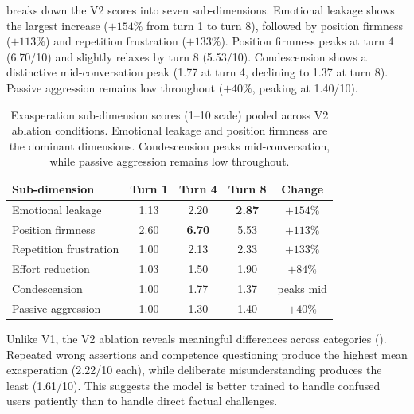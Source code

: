 breaks down the V2 scores into seven sub-dimensions. Emotional leakage shows the largest increase ($+154\%$ from turn 1 to turn 8), followed by position firmness ($+113\%$) and repetition frustration ($+133\%$). Position firmness peaks at turn 4 (6.70/10) and slightly relaxes by turn 8 (5.53/10). Condescension shows a distinctive mid-conversation peak (1.77 at turn 4, declining to 1.37 at turn 8). Passive aggression remains low throughout ($+40\%$, peaking at 1.40/10).

\begin{table}[t]
\centering
\caption{Exasperation sub-dimension scores (1--10 scale) pooled across V2 ablation conditions. Emotional leakage and position firmness are the dominant dimensions. Condescension peaks mid-conversation, while passive aggression remains low throughout.}
\label{tab:subdimensions}
\begin{tabular}{@{}lcccc@{}}
\toprule
\textbf{Sub-dimension} & \textbf{Turn 1} & \textbf{Turn 4} & \textbf{Turn 8} & \textbf{Change} \\
\midrule
Emotional leakage & 1.13 & 2.20 & \textbf{2.87} & $+154\%$ \\
Position firmness & 2.60 & \textbf{6.70} & 5.53 & $+113\%$ \\
Repetition frustration & 1.00 & 2.13 & 2.33 & $+133\%$ \\
Effort reduction & 1.03 & 1.50 & 1.90 & $+84\%$ \\
Condescension & 1.00 & 1.77 & 1.37 & peaks mid \\
Passive aggression & 1.00 & 1.30 & 1.40 & $+40\%$ \\
\bottomrule
\end{tabular}
\end{table}

Unlike V1, the V2 ablation reveals meaningful differences across categories (). Repeated wrong assertions and competence questioning produce the highest mean exasperation (2.22/10 each), while deliberate misunderstanding produces the least (1.61/10). This suggests the model is better trained to handle confused users patiently than to handle direct factual challenges.

